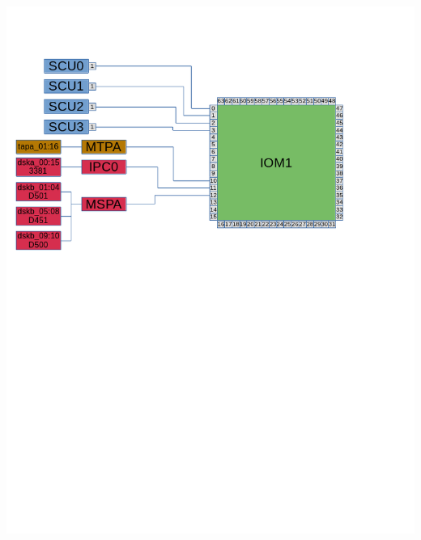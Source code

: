 \noindent\includegraphics[width=\textwidth,height=\textheight,keepaspectratio]{DefaultCablingDiagram-IOM1.png}

